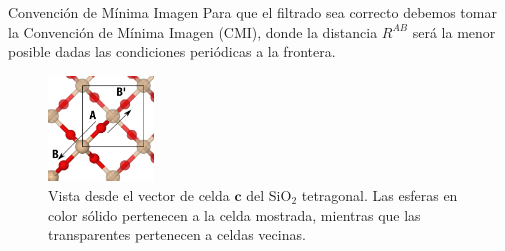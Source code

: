 \documentclass[dvisvgm,11pt,aspectratio=169]{beamer}
\begin{document}
\begin{frame}{Convención de Mínima Imagen}
Para que el filtrado sea correcto debemos tomar la Convención de Mínima Imagen (CMI), donde la distancia $R^{AB}$ será la menor posible dadas las condiciones periódicas a la frontera.
\begin{figure}[h]
    \centering
    \includegraphics[width=0.25\textwidth]{img/micM_1.png}
    \caption{Vista desde el vector de celda $\mathbf{c}$ del SiO$_2$ tetragonal. Las esferas en color sólido pertenecen a la celda mostrada, mientras que las transparentes pertenecen a celdas vecinas.}
    \label{fig:mic1}
\end{figure}
\end{frame}
\end{document}
